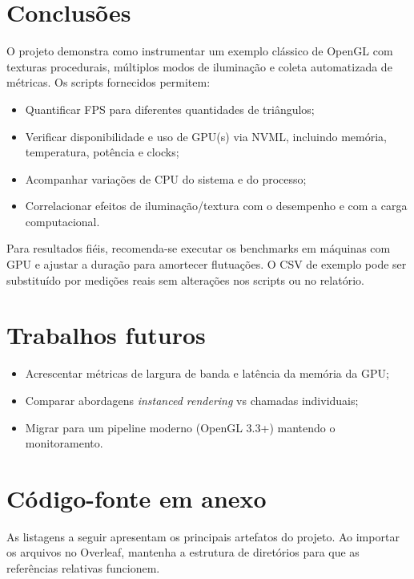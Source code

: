 \documentclass[11pt,a4paper]{article}
\begin{document}
\section{Conclusões}
O projeto demonstra como instrumentar um exemplo clássico de OpenGL com texturas
procedurais, múltiplos modos de iluminação e coleta automatizada de métricas.
Os scripts fornecidos permitem:

\begin{itemize}
  \item Quantificar FPS para diferentes quantidades de triângulos;
  \item Verificar disponibilidade e uso de GPU(s) via NVML, incluindo memória,
        temperatura, potência e clocks;
  \item Acompanhar variações de CPU do sistema e do processo;
  \item Correlacionar efeitos de iluminação/textura com o desempenho e com a
        carga computacional.
\end{itemize}

Para resultados fiéis, recomenda-se executar os benchmarks em máquinas com GPU e
ajustar a duração para amortecer flutuações. O CSV de exemplo pode ser substituído
por medições reais sem alterações nos scripts ou no relatório.

\section*{Trabalhos futuros}
\begin{itemize}
  \item Acrescentar métricas de largura de banda e latência da memória da GPU;
  \item Comparar abordagens \emph{instanced rendering} vs chamadas individuais;
  \item Migrar para um pipeline moderno (OpenGL 3.3+) mantendo o monitoramento.
\end{itemize}

\appendix
\section{Código-fonte em anexo}
As listagens a seguir apresentam os principais artefatos do projeto. Ao importar
os arquivos no Overleaf, mantenha a estrutura de diretórios para que as
referências relativas funcionem.








\end{document}
